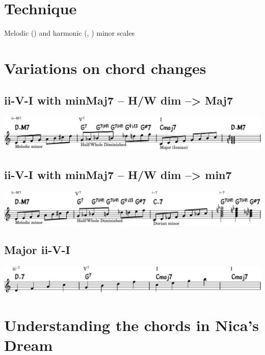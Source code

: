 \documentclass[11pt]{article}
\begin{document}
\section{Technique}
\label{sec:org039df83}
Melodic () and harmonic (, ) minor scales
\section{Variations on chord changes}
\label{sec:org72f7091}
\subsection{ii-V-I with minMaj7 -- H/W dim --> Maj7}
\label{sec:org9f6cbc7}

\begin{center}
\includegraphics[width=.98\linewidth]{scales-min-maj-to-maj7.pdf}
\end{center}

\subsection{ii-V-I with minMaj7 -- H/W dim --> min7}
\label{sec:orgb1d384f}
\begin{center}
\includegraphics[width=.98\linewidth]{scales-min-maj-to-min7.pdf}
\end{center}


\subsection{Major ii-V-I}
\label{sec:org1ee42c4}
\begin{center}
\includegraphics[width=.98\linewidth]{major_ii_v_i.pdf}
\end{center}



\section{Understanding the chords in Nica’s Dream}
\label{sec:orgc62997d}
\end{document}
